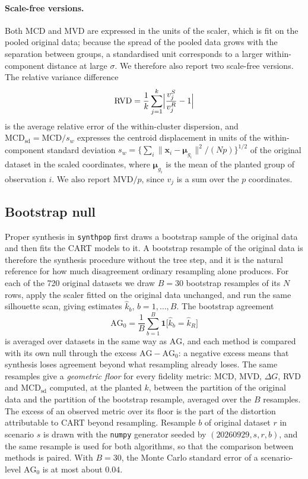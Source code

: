 \documentclass[pdflatex,referee]{sn-jnl}
\newcommand{\ind}{\mathbf{1}}
\newcommand{\bx}{\mathbf{x}}
\newcommand{\bmu}{\boldsymbol{\mu}}
\begin{document}
\paragraph{Scale-free versions.}
Both MCD and MVD are expressed in the units of the scaler, which is fit on the
pooled original data; because the spread of the pooled data grows with the
separation between groups, a standardised unit corresponds to a larger
within-component distance at large $\sigma$. We therefore also report two
scale-free versions. The relative variance difference
\begin{equation}
  \mathrm{RVD} = \frac{1}{k} \sum_{j=1}^{k}
    \Bigl| \frac{v_j^S}{v_j^R} - 1 \Bigr|
  \label{eq:rvd}
\end{equation}
is the average relative error of the within-cluster dispersion, and
$\mathrm{MCD}_{\mathrm{sd}} = \mathrm{MCD}/s_w$ expresses the centroid
displacement in units of the within-component standard deviation
$s_w = \{\sum_{i} \lVert \bx_i - \bmu_{g_i} \rVert^2 / (Np)\}^{1/2}$ of the
original dataset in the scaled coordinates, where $\bmu_{g_i}$ is the mean of
the planted group of observation $i$. We also report $\mathrm{MVD}/p$, since
$v_j$ is a sum over the $p$ coordinates.

\subsection{Bootstrap null}
\label{sec:null}

Proper synthesis in \texttt{synthpop} first draws a bootstrap sample of the
original data and then fits the CART models to it. A bootstrap resample of the
original data is therefore the synthesis procedure without the tree step, and
it is the natural reference for how much disagreement ordinary resampling
alone produces. For each of the 720 original datasets we draw $B = 30$
bootstrap resamples of its $N$ rows, apply the scaler fitted on the original
data unchanged, and run the same silhouette scan, giving estimates
$\hat{k}_{b}$, $b = 1,\dots,B$. The bootstrap agreement
\begin{equation}
  \mathrm{AG}_0 = \frac{1}{B} \sum_{b=1}^{B}
    \ind\bigl[\hat{k}_{b} = \hat{k}_{R}\bigr]
  \label{eq:ag0}
\end{equation}
is averaged over datasets in the same way as $\mathrm{AG}$, and each method is
compared with its own null through the excess $\mathrm{AG} - \mathrm{AG}_0$: a
negative excess means that synthesis loses agreement beyond what resampling
already loses. The same resamples give a \emph{geometric floor} for every
fidelity metric: MCD, MVD, $\Delta G$, RVD and $\mathrm{MCD}_{\mathrm{sd}}$
computed, at the planted $k$, between the partition of the original data and
the partition of the bootstrap resample, averaged over the $B$ resamples. The
excess of an observed metric over its floor is the part of the distortion
attributable to CART beyond resampling. Resample $b$ of original dataset $r$
in scenario $s$ is drawn with the \texttt{numpy} generator seeded by
$(20260929, s, r, b)$, and the same resample is used for both algorithms, so
that the comparison between methods is paired. With $B = 30$, the Monte Carlo
standard error of a scenario-level $\mathrm{AG}_0$ is at most about $0.04$.
\end{document}
